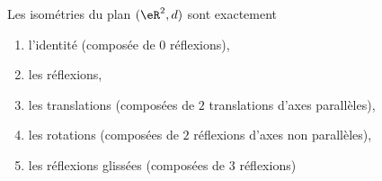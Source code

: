 \begin{theorem}      \label{THOooVRNOooAgaVRN}
	Les isométries du plan \( (\eR^2,d)\) sont exactement
	\begin{enumerate}
		\item
		      l'identité (composée de \( 0\) réflexions),
		\item
		      les réflexions,
		\item
		      les translations (composées de \( 2\) translations d'axes parallèles),
		\item
		      les rotations (composées de \( 2\) réflexions d'axes non parallèles),
		\item
		      les réflexions glissées (composées de \( 3\) réflexions)
	\end{enumerate}
\end{theorem}


